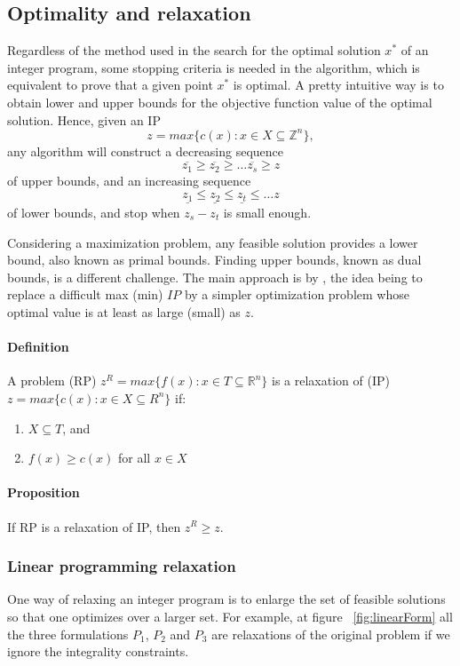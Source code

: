\subsection{Optimality and relaxation}

Regardless of the method used in the search for the optimal solution $x^*$ of an integer program, some stopping criteria is needed in the algorithm, which is equivalent to prove that a given point $x^*$ is optimal.
A pretty intuitive way is to obtain lower and upper bounds for the objective function value of the optimal solution. Hence, given an IP $$z = max\{c(x): x \in X \subseteq \mathbb{Z}^n\},$$ any algorithm will construct a decreasing sequence $$\overline{z_{1}} \ge \overline{z_{2}} \ge \ldots \overline{z_{s}} \ge z$$ of upper bounds, and an increasing sequence $$\underline{z_{1}} \le \underline{z_{2}} \le \underline{z_{t}} \le \ldots z$$ of lower bounds, and stop when $z_{s} - z_{t}$ is small enough.

Considering a maximization problem, any feasible solution provides a lower bound, also known as primal bounds. Finding upper bounds, known as dual bounds, is a different challenge. The main approach is by , the idea being to replace a difficult max (min) $IP$ by a simpler optimization problem whose optimal value is at least as large (small) as $z$.

\paragraph{Definition}
A problem (RP) $z^R = max\{f(x): x \in T \subseteq \mathbb{R}^n\}$ is a relaxation of (IP) $z = max\{c(x): x \in X \subseteq R^n\}$ if:
\begin{enumerate}
\item $X \subseteq T$, and
\item $f(x) \ge c(x)$ for all $x \in X$
\end{enumerate}

\paragraph{Proposition}
If RP is a relaxation of IP, then $z^R \ge z$.

\subsubsection{Linear programming relaxation}

One way of relaxing an integer program is to enlarge the set of feasible solutions so that one optimizes over a larger set. For example, at figure ~\ref{fig:linearForm} all the three formulations $P_{1}$, $P_{2}$ and $P_{3}$ are relaxations of the original problem if we ignore the integrality constraints.

